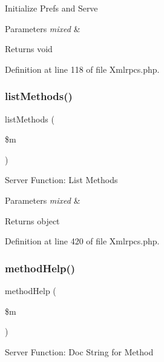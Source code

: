 Initialize Prefs and Serve


\begin{DoxyParams}{Parameters}
{\em mixed} & \\
\hline
\end{DoxyParams}
\begin{DoxyReturn}{Returns}
void 
\end{DoxyReturn}


Definition at line 118 of file Xmlrpcs.\+php.

\mbox{\label{class_c_i___xmlrpcs_ad640f0b44d1956a05cfe40bab4e4043d}} 
\subsubsection{\texorpdfstring{listMethods()}{listMethods()}}
{\footnotesize\ttfamily list\+Methods (\begin{DoxyParamCaption}\item[{}]{\$m }\end{DoxyParamCaption})}

Server Function\+: List Methods


\begin{DoxyParams}{Parameters}
{\em mixed} & \\
\hline
\end{DoxyParams}
\begin{DoxyReturn}{Returns}
object 
\end{DoxyReturn}


Definition at line 420 of file Xmlrpcs.\+php.

\mbox{\label{class_c_i___xmlrpcs_a97626f30e860f4a63463f8674827dc00}} 
\subsubsection{\texorpdfstring{methodHelp()}{methodHelp()}}
{\footnotesize\ttfamily method\+Help (\begin{DoxyParamCaption}\item[{}]{\$m }\end{DoxyParamCaption})}

Server Function\+: Doc String for Method



